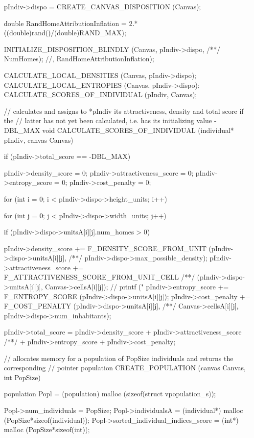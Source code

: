 \begin{C}
{	pIndiv->dispo = CREATE_CANVAS_DISPOSITION (Canvas);
	
	double RandHomeAttributionInflation = 2.*((double)rand()/(double)RAND_MAX);
	
	INITIALIZE_DISPOSITION_BLINDLY (Canvas, pIndiv->dispo,
	/**/ NumHomes); //, RandHomeAttributionInflation);
	
	CALCULATE_LOCAL_DENSITIES (Canvas, pIndiv->dispo);
	CALCULATE_LOCAL_ENTROPIES (Canvas, pIndiv->dispo);
	CALCULATE_SCORES_OF_INDIVIDUAL (pIndiv, Canvas);
}


// calculates and assigns to *pIndiv its attractiveness, density and total score if the
// latter has not yet been calculated, i.e. has its initializing value -DBL_MAX
void CALCULATE_SCORES_OF_INDIVIDUAL (individual* pIndiv, canvas Canvas){
	
	if (pIndiv->total_score == -DBL_MAX){
		
		pIndiv->density_score = 0;
		pIndiv->attractiveness_score = 0;
		pIndiv->entropy_score = 0;
		pIndiv->cost_penalty = 0;
		
		for (int i = 0; i < pIndiv->dispo->height_units; i++){
			for (int j = 0; j < pIndiv->dispo->width_units; j++){
				
				if (pIndiv->dispo->unitsA[i][j].num_homes > 0){
					
					pIndiv->density_score += F_DENSITY_SCORE_FROM_UNIT (pIndiv->dispo->unitsA[i][j],
					/**/ pIndiv->dispo->max_possible_density);
					pIndiv->attractiveness_score += F_ATTRACTIVENESS_SCORE_FROM_UNIT_CELL
					/**/ (pIndiv->dispo->unitsA[i][j], Canvas->cellsA[i][j]);
					// printf ("%
					pIndiv->entropy_score += F_ENTROPY_SCORE (pIndiv->dispo->unitsA[i][j]);
					pIndiv->cost_penalty += F_COST_PENALTY (pIndiv->dispo->unitsA[i][j],
					/**/ Canvas->cellsA[i][j], pIndiv->dispo->num_inhabitants);
				}
			}
		}
		pIndiv->total_score = pIndiv->density_score + pIndiv->attractiveness_score
		/**/ + pIndiv->entropy_score + pIndiv->cost_penalty;
	}
}


// allocates memory for a population of PopSize individuals and returns the corresponding
// pointer
population CREATE_POPULATION (canvas Canvas, int PopSize){
	
	population Popl = (population) malloc (sizeof(struct vpopulation_s));
	
	Popl->num_individuals = PopSize;
	Popl->individualsA = (individual*) malloc (PopSize*sizeof(individual));
	Popl->sorted_individual_indices_score = (int*) malloc (PopSize*sizeof(int));
	
}
\end{C}

